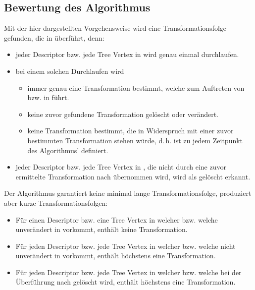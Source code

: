 \subsection{Bewertung des Algorithmus}
Mit der hier dargestellten Vorgehensweise wird eine Transformationsfolge  gefunden, die  in  
überführt, denn:

\begin{itemize}
  \item jeder Descriptor  bzw. jede Tree Vertex  in  wird genau einmal durchlaufen.
  \item bei einem solchen Durchlaufen wird
  \begin{itemize}
    \item immer genau eine Transformation bestimmt, welche zum Auftreten von  bzw.  in  führt.
    \item keine zuvor gefundene Transformation gelöscht oder verändert.
    \item keine Transformation bestimmt, die in Widerspruch mit einer zuvor bestimmten Transformation stehen würde, d.\,h.  ist zu jedem Zeitpunkt des Algorithmus' definiert.
  \end{itemize}
  \item jeder Descriptor  bzw. jede Tree Vertex  in , die nicht durch eine zuvor ermittelte Transformation nach  übernommen wird, wird als gelöscht erkannt.
\end{itemize}

Der Algorithmus garantiert keine minimal lange Transformationsfolge, produziert aber kurze Transformationsfolgen:
\begin{itemize}
 \item Für einen Descriptor bzw. eine Tree Vertex in  welcher bzw. welche unverändert in  vorkommt, enthält  keine Transformation.
 \item Für jeden Descriptor bzw. jede Tree Vertex in  welcher bzw. welche nicht unverändert in  vorkommt, enthält  höchstens eine Transformation. 
 \item Für jeden Descriptor bzw. jede Tree Vertex in  welcher bzw. welche bei der Überführung nach  gelöscht wird, enthält  höchstens eine Transformation. 
\end{itemize}

